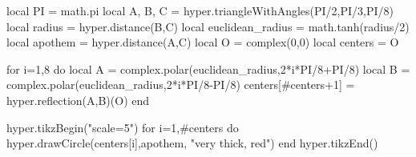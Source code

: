 \documentclass[multi,tikz]{standalone}
\begin{document}
\begin{luacode*}
local PI = math.pi
local A, B, C = hyper.triangleWithAngles(PI/2,PI/3,PI/8)
local radius = hyper.distance(B,C)
local euclidean_radius = math.tanh(radius/2)
local apothem = hyper.distance(A,C)
local O = complex(0,0)
local centers = {O}

for i=1,8 do
	local A = complex.polar(euclidean_radius,2*i*PI/8+PI/8)
	local B = complex.polar(euclidean_radius,2*i*PI/8-PI/8)
	centers[#centers+1] = hyper.reflection(A,B)(O)
end

hyper.tikzBegin("scale=5")
for i=1,#centers do
	hyper.drawCircle(centers[i],apothem, "very thick, red")
end
hyper.tikzEnd()
\end{luacode*}
\end{document}
